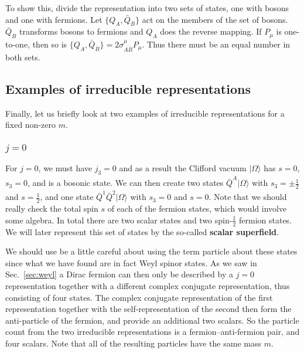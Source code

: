 \documentclass[notes.tex]{subfiles}
\begin{document}
To show this, divide the representation into two sets of states, one with bosons and one with fermions. Let $\{Q_A, \bar{Q}_{\dot{B}}\}$ act on the members of the set of bosons. $\bar{Q}_{\dot{B}}$ transforms bosons to fermions and $Q_A$ does the reverse mapping. If $P_\mu$ is one-to-one, then so is $\{Q_A, \bar{Q}_{\dot{B}}\} = 2\sigma^\mu_{A\dot{B}}P_\mu$. Thus there must be an equal number in both sets.

\subsection{Examples of irreducible representations}
\label{sec:SP_irreps}
Finally, let us briefly look at two examples of irreducible representations for a fixed non-zero $m$.

\subsubsection{$j=0$}
For $j=0$, we must have $j_3=0$ and as a result the Clifford vacuum $|\Omega\rangle$ has $s=0$, $s_3=0$, and is a bosonic state. We can then create two states $\bar{Q}^{\dot{A}}|\Omega\rangle$ with $s_3 = \pm\frac{1}{2}$ and $s = \frac{1}{2}$,  and one state $\bar{Q}^{\dot{1}}\bar{Q}^{\dot{2}}|\Omega\rangle$ with $s_3 = 0$ and $s = 0$. Note that we should really check the total spin $s$ of each of the fermion states, which would involve some algebra. In total there are two scalar states and two spin-$\frac{1}{2}$ fermion states. We will later represent this set of states by the so-called {\bf scalar superfield}. 

We should use be a little careful about using the term particle about these states since what we have found are in fact Weyl spinor states. As we saw in Sec.~\ref{sec:weyl} a Dirac fermion can then only be described by a $j=0$ representation together with a different complex conjugate representation, thus consisting of four states.
The complex conjugate representation of the first representation together with the self-representation of the second then form the anti-particle of the fermion, and provide an additional two scalars. So the particle count from the two irreducible representations is a fermion--anti-fermion pair, and four scalars. Note that all of the resulting particles have the same mass $m$.
\end{document}
